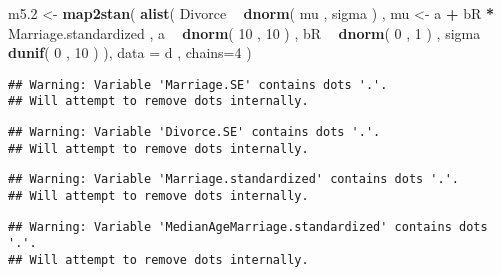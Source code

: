 \documentclass[]{article}
\newenvironment{Shaded}{\begin{snugshade}}{\end{snugshade}}
\newcommand{\KeywordTok}[1]{\textcolor[rgb]{0.13,0.29,0.53}{\textbf{#1}}}
\newcommand{\DataTypeTok}[1]{\textcolor[rgb]{0.13,0.29,0.53}{#1}}
\newcommand{\DecValTok}[1]{\textcolor[rgb]{0.00,0.00,0.81}{#1}}
\newcommand{\StringTok}[1]{\textcolor[rgb]{0.31,0.60,0.02}{#1}}
\newcommand{\OperatorTok}[1]{\textcolor[rgb]{0.81,0.36,0.00}{\textbf{#1}}}
\newcommand{\NormalTok}[1]{#1}
\begin{document}
\begin{Shaded}
\begin{Highlighting}[]
\NormalTok{m5.}\DecValTok{2}\NormalTok{ <-}\StringTok{ }\KeywordTok{map2stan}\NormalTok{(}
  \KeywordTok{alist}\NormalTok{(}
\NormalTok{    Divorce }\OperatorTok{~}\StringTok{ }\KeywordTok{dnorm}\NormalTok{( mu , sigma ) ,}
\NormalTok{    mu <-}\StringTok{ }\NormalTok{a }\OperatorTok{+}\StringTok{ }\NormalTok{bR }\OperatorTok{*}\StringTok{ }\NormalTok{Marriage.standardized ,}
\NormalTok{    a }\OperatorTok{~}\StringTok{ }\KeywordTok{dnorm}\NormalTok{( }\DecValTok{10}\NormalTok{ , }\DecValTok{10}\NormalTok{ ) ,}
\NormalTok{    bR }\OperatorTok{~}\StringTok{ }\KeywordTok{dnorm}\NormalTok{( }\DecValTok{0}\NormalTok{ , }\DecValTok{1}\NormalTok{ ) ,}
\NormalTok{    sigma }\OperatorTok{~}\StringTok{ }\KeywordTok{dunif}\NormalTok{( }\DecValTok{0}\NormalTok{ , }\DecValTok{10}\NormalTok{ )}
\NormalTok{  ),}
  \DataTypeTok{data =}\NormalTok{ d , }\DataTypeTok{chains=}\DecValTok{4}\NormalTok{ )}
\end{Highlighting}
\end{Shaded}

\begin{verbatim}
## Warning: Variable 'Marriage.SE' contains dots '.'.
## Will attempt to remove dots internally.
\end{verbatim}

\begin{verbatim}
## Warning: Variable 'Divorce.SE' contains dots '.'.
## Will attempt to remove dots internally.
\end{verbatim}

\begin{verbatim}
## Warning: Variable 'Marriage.standardized' contains dots '.'.
## Will attempt to remove dots internally.
\end{verbatim}

\begin{verbatim}
## Warning: Variable 'MedianAgeMarriage.standardized' contains dots '.'.
## Will attempt to remove dots internally.
\end{verbatim}
\end{document}

